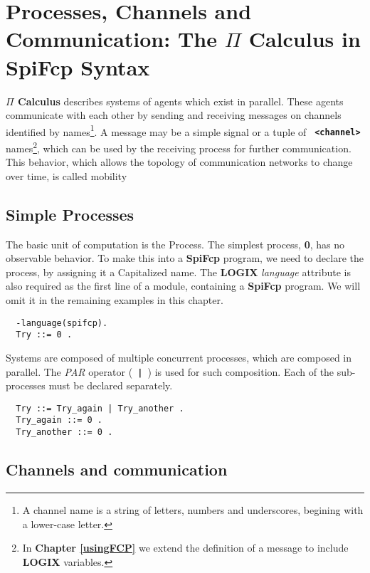 \documentclass[twoside,10pt]{report}
\begin{document}
\chapter{Processes, Channels and Communication: The {\bf $\Pi$ Calculus} in
{\bf SpiFcp} Syntax}
\label{syntax}

{\bf $\Pi$ Calculus} describes systems of agents which exist in
parallel. These agents communicate with each other by sending and
receiving messages on channels identified by names\footnote{
A channel name is a string of letters, numbers and underscores, begining
with a lower-case letter.}.
A message may
be a simple signal or a tuple of {\bf \verb+ <channel> +} names\footnote{
In {\bf Chapter \ref{usingFCP}} we extend the definition of a message to
include {\bf LOGIX} variables.},
which can be used by the
receiving process for further communication. This behavior, which
allows the topology of communication networks to change over time, is
called mobility

\section{Simple Processes}

The basic unit of computation is the Process. The simplest process, {\bf 0},
has no observable behavior. To make this into a {\bf SpiFcp} program, we need
to declare the process, by assigning it a Capitalized name. The {\bf LOGIX}
{\em language} attribute is also required as the first line of a module,
containing a {\bf SpiFcp} program. We
will omit it in the remaining examples in this chapter.

\begin{verbatim}
  -language(spifcp).
  Try ::= 0 .
\end{verbatim}

Systems are composed of multiple concurrent processes, which are
composed in parallel. The {\em PAR} operator ({\bf\verb+ | +})
is used for such
composition. Each of the sub-processes must be declared separately.

\newpage
{\bfseries
 \begin{verbatim}
  Try ::= Try_again | Try_another .
  Try_again ::= 0 .
  Try_another ::= 0 .
 \end{verbatim}
}

\section{Channels and communication}
\end{document}
